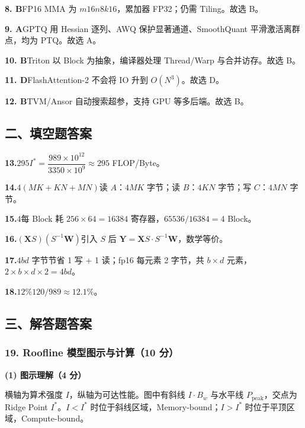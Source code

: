 \documentclass[11pt,a4paper]{article}
\begin{document}
\noindent\textbf{8. B}\quad FP16 MMA 为 $m16n8k16$，累加器 FP32；仍需 Tiling。故选 B。

\noindent\textbf{9. A}\quad GPTQ 用 Hessian 逐列、AWQ 保护显著通道、SmoothQuant 平滑激活离群点，均为 PTQ。故选 A。

\noindent\textbf{10. B}\quad Triton 以 Block 为抽象，编译器处理 Thread/Warp 与合并访存。故选 B。

\noindent\textbf{11. D}\quad FlashAttention-2 不会将 IO 升到 $O(N^3)$。故选 D。

\noindent\textbf{12. B}\quad TVM/Ansor 自动搜索超参，支持 GPU 等多后端。故选 B。

\subsection*{\heiti 二、填空题答案}

\noindent\textbf{13.}\quad $295$\quad $I^*=\dfrac{989\times10^{12}}{3350\times10^9}\approx295$ FLOP/Byte。

\noindent\textbf{14.}\quad $4(MK+KN+MN)$\quad 读 $A$：$4MK$ 字节；读 $B$：$4KN$ 字节；写 $C$：$4MN$ 字节。

\noindent\textbf{15.}\quad $4$\quad 每 Block 耗 $256\times64=16384$ 寄存器，$65536/16384=4$ Block。

\noindent\textbf{16.}\quad $(\mathbf{X}S)(S^{-1}\mathbf{W})$\quad 引入 $S$ 后 $\mathbf{Y}=\mathbf{X}S\cdot S^{-1}\mathbf{W}$，数学等价。

\noindent\textbf{17.}\quad $4bd$ 字节\quad 节省 1 写 + 1 读；fp16 每元素 2 字节，共 $b\times d$ 元素，$2\times b\times d\times2=4bd$。

\noindent\textbf{18.}\quad $12\%$\quad $120/989\approx12.1\%$。

\subsection*{\heiti 三、解答题答案}

\subsubsection*{19. Roofline 模型图示与计算（10 分）}

\noindent\textbf{(1) 图示理解（4 分）}

横轴为算术强度 $I$，纵轴为可达性能。图中有斜线 $I\cdot B_w$ 与水平线 $P_{\mathrm{peak}}$，交点为 Ridge Point $I^*$。$I<I^*$ 时位于斜线区域，Memory-bound；$I>I^*$ 时位于平顶区域，Compute-bound。
\end{document}

